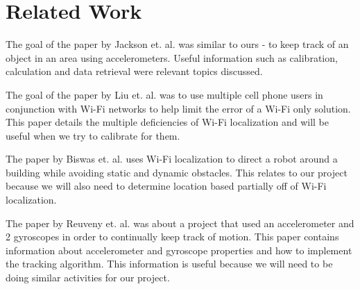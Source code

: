 \section{Related Work}
\label{sec:related}
The goal of the paper by Jackson et. al.\cite{Jackson:2006:LTT:1376148.1376210} was similar to ours - to keep track of an object in an area using accelerometers. Useful information such as calibration, calculation and data retrieval were relevant topics discussed.

The goal of the paper by Liu et. al.\cite{Liu:2012:PLW:2348543.2348581} was to use multiple cell phone users in conjunction with Wi-Fi networks to help limit the error of a Wi-Fi only solution. This paper details the multiple deficiencies of Wi-Fi localization and will be useful when we try to calibrate for them.

The paper by Biswas et. al.\cite{Biswas_2010_6819} uses Wi-Fi localization to direct a robot around a building while avoiding static and dynamic obstacles. This relates to our project because we will also need to determine location based partially off of Wi-Fi localization.

The paper by Reuveny et. al.\cite{unpublished-minimal} was about a project that used an accelerometer and 2 gyroscopes in order to continually keep track of motion. This paper contains information about accelerometer and gyroscope properties and how to implement the tracking algorithm. This information is useful because we will need to be doing similar activities for our project.


